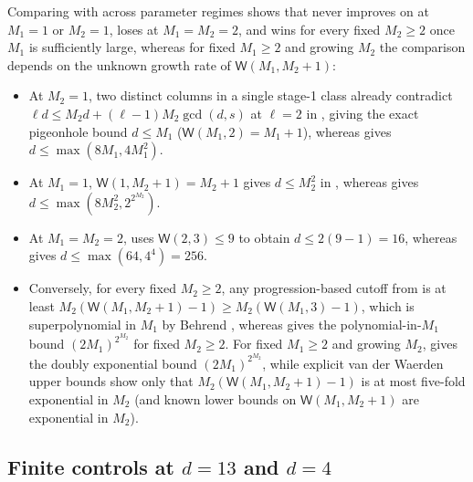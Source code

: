 \begin{remark}\label{rem:2a-vs-p19}
Comparing  with \cite[Theorem~6.3]{SharedDecoders2026} across parameter regimes shows
that  never improves on \cite[Theorem~6.3]{SharedDecoders2026} at $M_1 = 1$ or
$M_2 = 1$, loses at $M_1 = M_2 = 2$, and wins for every fixed $M_2 \ge 2$ once $M_1$ is sufficiently
large, whereas for fixed $M_1 \ge 2$ and growing $M_2$ the comparison depends on the unknown growth
rate of $\mathsf{W}(M_1, M_2 + 1)$:
\begin{itemize}[leftmargin=1.5em]
\item At $M_2 = 1$, two distinct columns in a single stage-1 class already contradict
  $\ell d \le M_2 d + (\ell - 1)M_2\gcd(d, s)$ at $\ell = 2$ in
  \cite[Theorem~6.3]{SharedDecoders2026}, giving the exact pigeonhole bound $d \le M_1$
  ($\mathsf{W}(M_1, 2) = M_1 + 1$), whereas  gives $d \le \max(8M_1, 4M_1^2)$.
\item At $M_1 = 1$, $\mathsf{W}(1, M_2 + 1) = M_2 + 1$ gives $d \le M_2^2$ in
  \cite[Theorem~6.3]{SharedDecoders2026}, whereas  gives
  $d \le \max(8M_2^2, 2^{2^{M_2}})$.
\item At $M_1 = M_2 = 2$, \cite[Corollary~6.4]{SharedDecoders2026} uses $\mathsf{W}(2, 3) \le 9$ to
  obtain $d \le 2(9 - 1) = 16$, whereas  gives $d \le \max(64, 4^4) = 256$.
\item Conversely, for every fixed $M_2 \ge 2$, any progression-based cutoff from
  \cite[Theorem~6.3]{SharedDecoders2026} is at least $M_2(\mathsf{W}(M_1, M_2 + 1) - 1) \ge
  M_2(\mathsf{W}(M_1, 3) - 1)$, which is superpolynomial in $M_1$ by Behrend \cite{Behrend1946},
  whereas  gives the polynomial-in-$M_1$ bound $(2M_1)^{2^{M_2}}$ for fixed
  $M_2 \ge 2$. For fixed $M_1 \ge 2$ and growing $M_2$,  gives the doubly exponential
  bound $(2M_1)^{2^{M_2}}$, while explicit van der Waerden upper bounds \cite{Gowers2001} show only
  that $M_2(\mathsf{W}(M_1, M_2 + 1) - 1)$ is at most five-fold exponential in $M_2$ (and known
  lower bounds on $\mathsf{W}(M_1, M_2 + 1)$ are exponential in $M_2$).
\end{itemize}
\end{remark}

\subsection{Finite controls at \texorpdfstring{$d = 13$}{d = 13} and \texorpdfstring{$d = 4$}{d = 4}}\label{sec:cube-controls}

